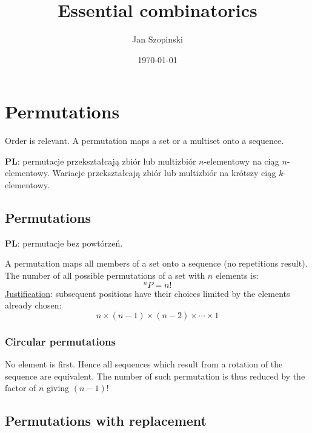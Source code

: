 \documentclass{article}
\begin{document}
\title{Essential combinatorics}
\author{Jan Szopinski}
\date{\frontdate\today}
\maketitle

\section{Permutations}

Order is relevant. A permutation maps a set or a multiset onto a sequence.

\textbf{PL}: permutacje przekształcają zbiór lub multizbiór $n$\nobreakdash-\hspace{0pt}elementowy na ciąg $n$\nobreakdash-\hspace{0pt}elementowy.
Wariacje przekształcają zbiór lub multizbiór na krótszy ciąg $k$\nobreakdash-\hspace{0pt}elementowy.

\subsection{Permutations}

\textbf{PL}: permutacje bez powtórzeń.

A permutation maps all members of a set onto a sequence (no repetitions result).
The number of all possible permutations of a set with $n$ elements is:
\begin{equation}
    ^nP = n!
\end{equation}
\underline{Justification}: subsequent positions have their choices limited by the elements already chosen:
\begin{equation*}
    n\times(n-1)\times(n-2)\times \dotsb \times 1
\end{equation*}

\subsubsection{Circular permutations}

No element is first.
Hence all sequences which result from a rotation of the sequence are equivalent.
The number of such permutation is thus reduced by the factor of $n$ giving ${(n-1)!}$

\subsection{Permutations with replacement}
\end{document}
